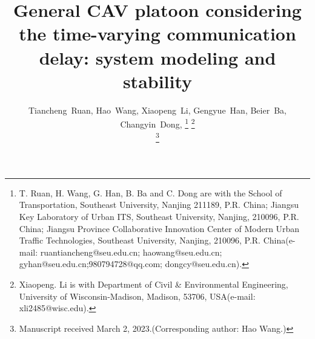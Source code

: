 \documentclass[journal]{IEEEtran}
\begin{document}
%
\title{General CAV platoon considering the time-varying communication delay: system modeling and stability}
%
%
%

\author{Tiancheng~Ruan,
        Hao~Wang,
        Xiaopeng~Li,
        Gengyue~Han,
        Beier~Ba,
        Changyin~Dong,
\thanks{T. Ruan, H. Wang, G. Han, B. Ba and C. Dong are with the
School of Transportation, Southeast University, Nanjing 211189, P.R. China;
Jiangsu Key Laboratory of Urban ITS, Southeast University, Nanjing, 210096, P.R. China;
Jiangsu Province Collaborative Innovation Center of Modern Urban Traffic Technologies, Southeast University, Nanjing, 210096, P.R. China(e-mail: ruantiancheng@seu.edu.cn;  haowang@seu.edu.cn; gyhan@seu.edu.cn;980794728@qq.com;
dongcy@seu.edu.cn).}%
\thanks{Xiaopeng. Li is with Department of Civil \& Environmental Engineering, University of Wisconsin-Madison, Madison, 53706, USA(e-mail: xli2485@wisc.edu).}

\thanks{Manuscript received March 2, 2023.(Corresponding author: Hao Wang.)}}

% 
%
\end{document}
